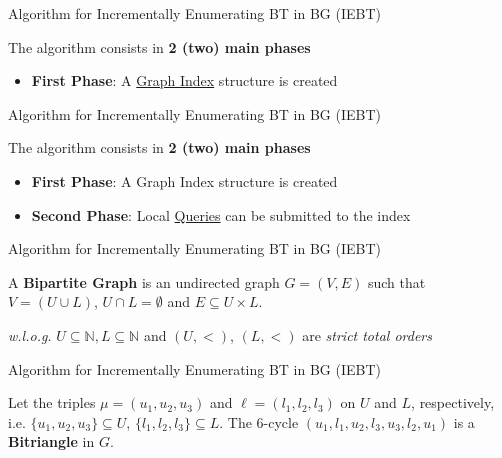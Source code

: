\begin{frame}[fragile]{Algorithm for Incrementally Enumerating BT in BG (IEBT)}
  \begin{center}
  \large The algorithm consists in \textbf{2 (two) main phases} 
  \end{center}  
  \vspace{2em}   
  \begin{itemize}
    \setlength\itemsep{2em}
    \item \textbf{First Phase}: A \underline{\color{red}Graph Index} structure is created
  \end{itemize}
\end{frame}

\begin{frame}[fragile]{Algorithm for Incrementally Enumerating BT in BG (IEBT)}
  \begin{center}
  \large The algorithm consists in \textbf{2 (two) main phases} 
  \end{center}     
  \vspace{2em}   
  \begin{itemize}
    \setlength\itemsep{2em}
    \item {\color{light}\textbf{First Phase}: A Graph Index structure is created}
    \item \textbf{Second Phase}: Local \underline{\color{red}Queries} can be submitted to the index
  \end{itemize}
\end{frame}

\begin{frame}[fragile]{Algorithm for Incrementally Enumerating BT in BG (IEBT)}
  \begin{center}
  \large A \textbf{Bipartite Graph} is an undirected graph $G=(V,E)$  such that $V=(U\cup L)$, $U\cap L=\emptyset$ and $E\subseteq U\times L$.
  \end{center}     
  \begin{center}
    \small \emph{w.l.o.g.} $U \subseteq \mathbb{N}, L \subseteq \mathbb{N}$ and $(U, <)$, $(L, <)$ are \emph{strict total orders}
  \end{center}            
  \begin{figure}
    \centering
  \end{figure}
\end{frame}

\begin{frame}[fragile]{Algorithm for Incrementally Enumerating BT in BG (IEBT)}
  \begin{center}
  Let the triples $\mu=(u_1, u_2, u_3)$ and $\ell=(l_1, l_2,l_3)$ on $U$ and $L$, respectively, i.e.  $\{u_1, u_2, u_3\} \subseteq U$, $\{l_1, l_2,l_3\} \subseteq L$. 
  The 6-cycle $(u_1,l_1,u_2,l_3,u_3,l_2,u_1)$  is a \textbf{Bitriangle} in $G$. 
  \end{center}      
  \begin{figure}
    \centering
  \end{figure}
\end{frame}

